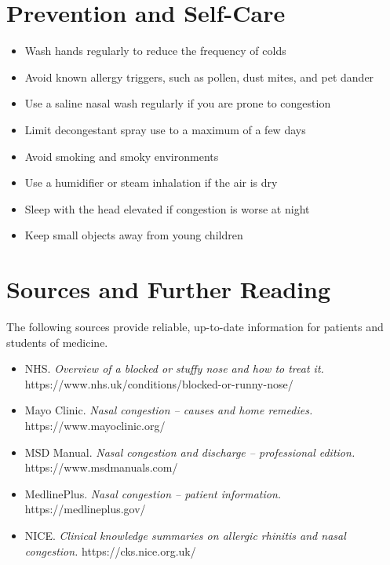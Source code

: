 \section*{Prevention and Self-Care}
\begin{itemize}
    \item Wash hands regularly to reduce the frequency of colds
    \item Avoid known allergy triggers, such as pollen, dust mites, and pet dander
    \item Use a saline nasal wash regularly if you are prone to congestion
    \item Limit decongestant spray use to a maximum of a few days
    \item Avoid smoking and smoky environments
    \item Use a humidifier or steam inhalation if the air is dry
    \item Sleep with the head elevated if congestion is worse at night
    \item Keep small objects away from young children
\end{itemize}

\section*{Sources and Further Reading}
The following sources provide reliable, up-to-date information for patients and students of medicine.

\begin{itemize}
    \item NHS. \textit{Overview of a blocked or stuffy nose and how to treat it.} https://www.nhs.uk/conditions/blocked-or-runny-nose/
    \item Mayo Clinic. \textit{Nasal congestion -- causes and home remedies.} https://www.mayoclinic.org/
    \item MSD Manual. \textit{Nasal congestion and discharge -- professional edition.} https://www.msdmanuals.com/
    \item MedlinePlus. \textit{Nasal congestion -- patient information.} https://medlineplus.gov/
    \item NICE. \textit{Clinical knowledge summaries on allergic rhinitis and nasal congestion.} https://cks.nice.org.uk/
\end{itemize}
